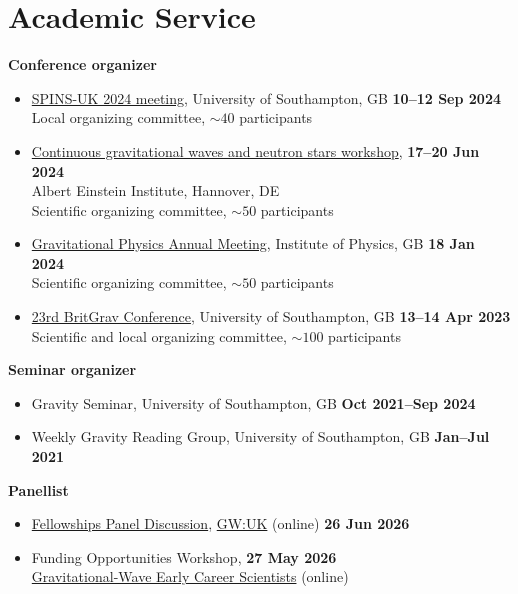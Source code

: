 \section{Academic Service}

\textbf{Conference organizer}
%
\vspace*{0.05in}
\begin{itemize}
    \item[]
    \href{https://sites.google.com/view/spins-uk-2024}{SPINS-UK 2024 meeting},
    University of Southampton, GB
    \hfill \textbf{10--12 Sep 2024} \\
    \hspace*{1em} Local organizing committee, $\sim 40$ participants
    \item[]
    \href{https://plan.events.mpg.de/event/133}%
    {Continuous gravitational waves and neutron stars workshop},
    \hfill \textbf{17--20 Jun 2024} \\
    Albert Einstein Institute, Hannover, DE \\
    \hspace*{1em} Scientific organizing committee, $\sim 50$ participants
    \item[]
    \href{https://iop.eventsair.com/gpm2024/}%
    {Gravitational Physics Annual Meeting},
    Institute of Physics, GB \hfill \textbf{18 Jan 2024} \\
    \hspace*{1em} Scientific organizing committee, $\sim 50$ participants
    \item[]
    \href{https://sites.google.com/view/britgrav23}{23rd BritGrav Conference},
    University of Southampton, GB \hfill \textbf{13--14 Apr 2023} \\
    \hspace*{1em} Scientific and local organizing committee,
    $\sim 100$ participants
\end{itemize}

\textbf{Seminar organizer}
%
\vspace*{0.05in}
\begin{itemize}
    \item[] Gravity Seminar, University of Southampton, GB
    \hfill \textbf{Oct 2021--Sep 2024}
    \item[] Weekly Gravity Reading Group, University of Southampton, GB
    \hfill \textbf{Jan--Jul 2021}
\end{itemize}

\textbf{Panellist}
%
\vspace*{0.05in}
\begin{itemize}
    \item[] \href{https://www.gwuk.org/seminars#h.j7b7b310f4av}
    {Fellowships Panel Discussion},
    \href{https://www.gwuk.org/}{GW:UK} (online) \hfill \textbf{26 Jun 2026}
    \item[] Funding Opportunities Workshop, \hfill \textbf{27 May 2026} \\
    \href{https://gwecs.org/}{Gravitational-Wave Early Career Scientists}
    (online)
\end{itemize}

